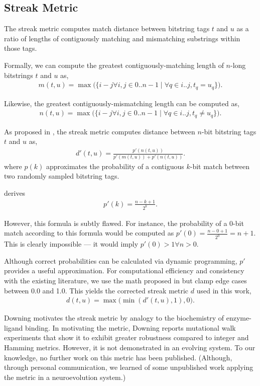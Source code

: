 \subsection{Streak Metric} \label{sec:streak}

The streak metric computes match distance between bitstring tags $t$ and $u$ as a ratio of lengths of contiguously matching and mismatching substrings within those tags.

Formally, we can compute the greatest contiguously-matching length of $n$-long bitstrings $t$ and $u$ as,
\begin{align*}
m(t, u) = \max\Big(\{i - j \forall i, j \in 0..n-1 \mid \forall q \in i..j, t_q = u_q \}\Big).
\end{align*}

Likewise, the greatest contiguously-mismatching length can be computed as,
\begin{align*}
n(t, u) = \max\Big(\{i - j \forall i, j \in 0..n-1 \mid \forall q \in i..j, t_q \neq u_q \}\Big).
\end{align*}

As proposed in \cite{downing2015intelligence}, the streak metric computes distance between $n$-bit bitstring tags $t$ and $u$ as,
\begin{align*}
d'(t, u)
= \frac{p'(n(t,u))}{p'(m(t,u)) + p'(n(t,u))}.
\end{align*}
where $p(k)$ approximates the probability of a contiguous $k$-bit match between two randomly sampled bitstring tags.

\cite{downing2015intelligence} derives
\begin{align*}
p'(k)
= \frac{n - k + 1}{2^k}.
\end{align*}

However, this formula is subtly flawed.
For instance, the probability of a $0$-bit match according to this formula would be computed as $p'(0) = \frac{n - 0 + 1}{2^0} = n + 1$.
This is clearly impossible --- it would imply $p'(0) > 1 \forall n > 0$.

Although correct probabilities can be calculated via dynamic programming, $p'$ provides a useful approximation.
For computational efficiency and consistency with the existing literature, we use the math proposed in \citep{downing2015intelligence} but clamp edge cases between 0.0 and 1.0.
This yields the corrected streak metric $d$ used in this work,
\begin{align*}
d(t, u) = \max\Big( \min( d'(t, u), 1), 0 \Big).
\end{align*}

Downing motivates the streak metric by analogy to the biochemistry of enzyme-ligand binding.
In motivating the metric, Downing reports mutational walk experiments that show it to exhibit greater robustness compared to integer and Hamming metrics.
However, it is not demonstrated in an evolving system.
To our knowledge, no further work on this metric has been published.
(Although, through personal communication, we learned of some unpublished work applying the metric in a neuroevolution system.)

